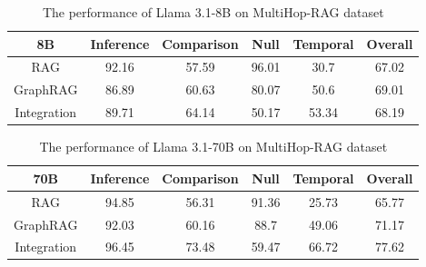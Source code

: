 \begin{table}[!htb]
\centering
\caption{The performance of Llama 3.1-8B on MultiHop-RAG dataset}
\label{app:tab:inte2}
\begin{tabular}{cccccc}
\hline
8B & Inference & Comparison & Null & Temporal & Overall \\ \hline
RAG & 92.16 & 57.59 & 96.01 & 30.7 & 67.02 \\
GraphRAG & 86.89 & 60.63 & 80.07 & 50.6 & 69.01 \\
Integration & 89.71 & 64.14 & 50.17 & 53.34 & 68.19 \\ \hline
\end{tabular}
\end{table}

\begin{table}[!htb]
\centering
\caption{The performance of Llama 3.1-70B on MultiHop-RAG dataset}
\label{app:tab:inte3}
\begin{tabular}{cccccc}
\hline
70B & Inference & Comparison & Null & Temporal & Overall \\ \hline
RAG & 94.85 & 56.31 & 91.36 & 25.73 & 65.77 \\
GraphRAG & 92.03 & 60.16 & 88.7 & 49.06 & 71.17 \\
Integration & 96.45 & 73.48 & 59.47 & 66.72 & 77.62 \\ \hline
\end{tabular}
\end{table}

\begin{table}[!htb]
\centering
\caption{Performance of integrating RAG and GraphRAG with Llama 3.1–8B on the NovelQA dataset.}
\label{app:tab:inte4}
\end{table}

